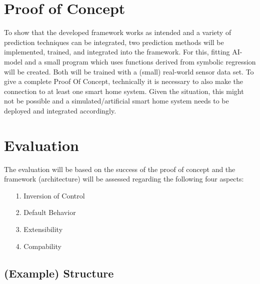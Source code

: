 \documentclass[a4paper,11pt]{article}
\begin{document}
\newpage
\section{Proof of Concept}
To show that the developed framework works as intended and a variety of prediction techniques can be integrated, two prediction methods will be implemented, trained, and integrated into the framework.
For this, fitting AI-model and a small program which uses functions derived from symbolic regression will be created.
Both will be trained with a (small) real-world sensor data set.
To give a complete Proof Of Concept, technically it is necessary to also make the connection to at least one smart home system.
Given the situation, this might not be possible and a simulated/artificial smart home system needs to be deployed and integrated accordingly.


\section{Evaluation}
The evaluation will be based on the success of the proof of concept and the framework (architecture) will be assessed regarding the following four aspects:
\begin{itemize}
    \item[1.] Inversion of Control
    \item[2.] Default Behavior
    \item[3.] Extensibility
    \item[4.] Compability
\end{itemize}

\newpage
\subsection{(Example) Structure}
\end{document}
